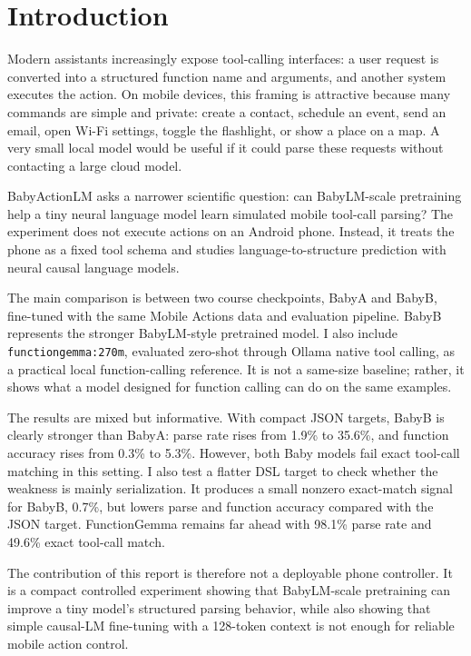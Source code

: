 \section{Introduction}

Modern assistants increasingly expose tool-calling interfaces: a user request is converted into a structured function name and arguments, and another system executes the action. On mobile devices, this framing is attractive because many commands are simple and private: create a contact, schedule an event, send an email, open Wi-Fi settings, toggle the flashlight, or show a place on a map. A very small local model would be useful if it could parse these requests without contacting a large cloud model.

BabyActionLM asks a narrower scientific question: can BabyLM-scale pretraining help a tiny neural language model learn simulated mobile tool-call parsing? The experiment does not execute actions on an Android phone. Instead, it treats the phone as a fixed tool schema and studies language-to-structure prediction with neural causal language models.

The main comparison is between two course checkpoints, BabyA and BabyB, fine-tuned with the same Mobile Actions data and evaluation pipeline. BabyB represents the stronger BabyLM-style pretrained model. I also include \texttt{functiongemma:270m}, evaluated zero-shot through Ollama native tool calling, as a practical local function-calling reference. It is not a same-size baseline; rather, it shows what a model designed for function calling can do on the same examples.

The results are mixed but informative. With compact JSON targets, BabyB is clearly stronger than BabyA: parse rate rises from 1.9\% to 35.6\%, and function accuracy rises from 0.3\% to 5.3\%. However, both Baby models fail exact tool-call matching in this setting. I also test a flatter DSL target to check whether the weakness is mainly serialization. It produces a small nonzero exact-match signal for BabyB, 0.7\%, but lowers parse and function accuracy compared with the JSON target. FunctionGemma remains far ahead with 98.1\% parse rate and 49.6\% exact tool-call match.

The contribution of this report is therefore not a deployable phone controller. It is a compact controlled experiment showing that BabyLM-scale pretraining can improve a tiny model's structured parsing behavior, while also showing that simple causal-LM fine-tuning with a 128-token context is not enough for reliable mobile action control.
